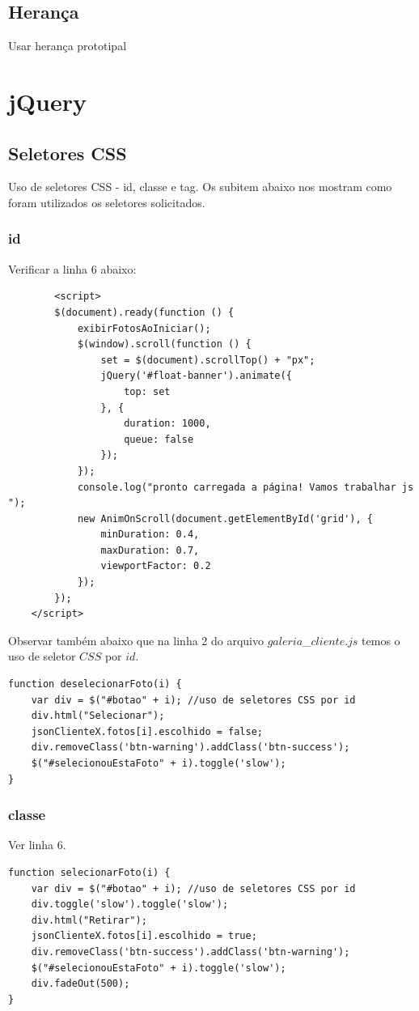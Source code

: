 \subsection{Herança}
Usar herança prototipal


\section{jQuery}
\subsection{Seletores CSS}

	Uso de seletores CSS - id, classe e tag. Os subitem abaixo nos mostram como foram utilizados os seletores solicitados.
	
\subsubsection{id}
	Verificar a linha $6$ abaixo:
		\begin{lstlisting}
	    <script>
        $(document).ready(function () {
            exibirFotosAoIniciar();
            $(window).scroll(function () {
                set = $(document).scrollTop() + "px";
                jQuery('#float-banner').animate({
                    top: set
                }, {
                    duration: 1000,
                    queue: false
                });
            });
            console.log("pronto carregada a página! Vamos trabalhar js ");
            new AnimOnScroll(document.getElementById('grid'), {
                minDuration: 0.4,
                maxDuration: 0.7,
                viewportFactor: 0.2
            });
        });
    </script>
	\end{lstlisting}

	Observar também abaixo que na linha 2 do arquivo $galeria$\_$cliente.js$ temos o uso de seletor $CSS$ por $id$.
	
\begin{lstlisting}
function deselecionarFoto(i) {
    var div = $("#botao" + i); //uso de seletores CSS por id
    div.html("Selecionar");
    jsonClienteX.fotos[i].escolhido = false;
    div.removeClass('btn-warning').addClass('btn-success');
    $("#selecionouEstaFoto" + i).toggle('slow');
}
\end{lstlisting}

\subsubsection{classe}
	Ver linha $6$.
\begin{lstlisting}
function selecionarFoto(i) {
    var div = $("#botao" + i); //uso de seletores CSS por id
    div.toggle('slow').toggle('slow');
    div.html("Retirar");
    jsonClienteX.fotos[i].escolhido = true;
    div.removeClass('btn-success').addClass('btn-warning');
    $("#selecionouEstaFoto" + i).toggle('slow');
    div.fadeOut(500);
}
\end{lstlisting}

